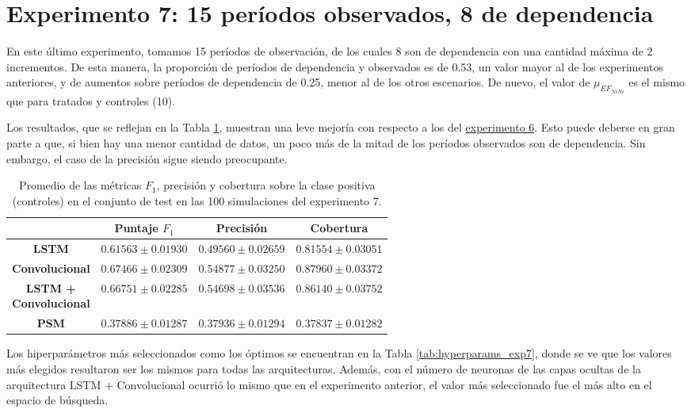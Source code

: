 \documentclass[../../main.tex]{subfiles}
\begin{document}
\section{Experimento 7: 15 períodos observados, 8 de dependencia} \label{sec:exp7}
En este último experimento, tomamos 15 períodos de observación, de los cuales 8 son de
dependencia con una cantidad máxima de 2 incrementos. De esta manera, la proporción de
períodos de dependencia y observados es de 0.53, un valor mayor al de los experimentos
anteriores, y de aumentos sobre períodos de dependencia de 0.25, menor al de los otros
escenarios. De nuevo, el valor de \(\mu_{{EF}_{NiNi}}\) es el mismo que para tratados
y controles (10).

Los resultados, que se reflejan en la Tabla \ref{tab:results_exp7}, muestran una leve
mejoría con respecto a los del \hyperref[sec:exp6]{experimento 6}. Esto puede deberse en
gran parte a que, si bien hay una menor cantidad de datos, un poco más de la mitad de los
períodos observados son de dependencia. Sin embargo, el caso de la precisión sigue siendo
preocupante.

\begin{table}[H]
    \centering
    \renewcommand{\arraystretch}{1.2}
    \label{tab:results_exp7}
    \begin{tabular}{|c|c|c|c|}
        \hline
         & \textbf{Puntaje} \(F_1\) & \textbf{Precisión} & \textbf{Cobertura} \\ \hline\hline
        \textbf{LSTM}
            & $0.61563 \pm 0.01930$ & $0.49560 \pm 0.02659$ & $0.81554 \pm 0.03051$ \\ \hline
        \textbf{Convolucional}
            & $\mathbf{0.67466 \pm 0.02309}$ & $\mathbf{0.54877 \pm 0.03250}$ & $\mathbf{0.87960 \pm 0.03372}$ \\ \hline
        \makecell{\textbf{LSTM +} \\ \textbf{Convolucional}}
            & $0.66751 \pm 0.02285$ & $0.54698 \pm 0.03536$ & $0.86140 \pm 0.03752$ \\ \hline
        \textbf{PSM}
            & $0.37886 \pm 0.01287$ & $0.37936 \pm 0.01294$ & $0.37837 \pm 0.01282$ \\
        \hline
    \end{tabular}
    \caption{Promedio de las métricas \(F_1\), precisión y cobertura sobre la
    clase positiva (controles) en el conjunto de test en las 100 simulaciones del
    experimento 7.}
\end{table}

Los hiperparámetros más seleccionados como los óptimos se encuentran en la Tabla
\ref{tab:hyperparams_exp7}, donde se ve que los valores más elegidos resultaron ser los
mismos para todas las arquitecturas. Además, con el número de neuronas de las capas
ocultas de la arquitectura LSTM + Convolucional ocurrió lo mismo que en el experimento
anterior, el valor más seleccionado fue el más alto en el espacio de búsqueda.
\end{document}
